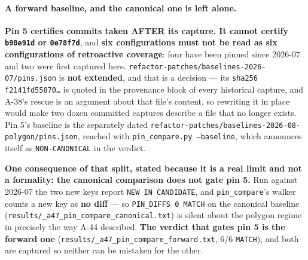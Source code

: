 \documentclass[
  10pt,
]{article}
\begin{document}
\paragraph{A forward baseline, and the canonical one is left alone.}
\textbf{Pin 5 certifies commits taken AFTER its capture. It cannot certify \texttt{b98e91d} or \texttt{0e78f7d}}, and \textbf{six configurations must not be read as six configurations of retroactive coverage}: four have been pinned since 2026-07 and two were first captured here. \texttt{refactor-patches/\allowbreak{}baselines-2026-07/\allowbreak{}pins.json} is \textbf{not extended}, and that is a decision --- its \texttt{sha256 f2141fd55870\dots} is quoted in the provenance block of every historical capture, and A-38's rescue is an argument about that file's content, so rewriting it in place would make two dozen committed captures describe a file that no longer exists. Pin 5's baseline is the separately dated \texttt{refactor-patches/\allowbreak{}baselines-2026-08-polygon/\allowbreak{}pins.json}, reached with \texttt{pin\_compare.py --baseline}, which announces itself as \texttt{NON-CANONICAL} in the verdict.

\textbf{One consequence of that split, stated because it is a real limit and not a formality: the canonical comparison does not gate pin 5.} Run against 2026-07 the two new keys report \texttt{NEW IN CANDIDATE}, and \texttt{pin\_compare}'s walker counts a new key as \textbf{no diff} --- so \texttt{PIN\_DIFFS 0 MATCH} on the canonical baseline (\texttt{results/\allowbreak{}\_a47\_pin\_compare\_canonical.txt}) is silent about the polygon regime in precisely the way A-44 described. \textbf{The verdict that gates pin 5 is the forward one} (\texttt{results/\allowbreak{}\_a47\_pin\_compare\_forward.txt}, 6/6 \texttt{MATCH}), and both are captured so neither can be mistaken for the other.
\end{document}
